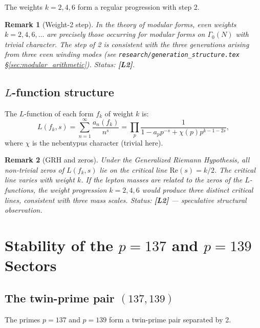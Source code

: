 \documentclass[11pt,a4paper]{article}
\newtheorem{remark}{Remark}
\begin{document}
The weights $k = 2, 4, 6$ form a regular progression with step 2.

\begin{remark}[Weight-2 step]
  In the theory of modular forms, even weights $k = 2, 4, 6, \ldots$ are
  precisely those occurring for modular forms on $\Gamma_0(N)$ with trivial
  character.  The step of 2 is consistent with the three generations arising
  from three even winding modes (see \texttt{research/generation\_structure.tex}
  §\ref{sec:modular_arithmetic}).  Status: \textbf{[L2]}.
\end{remark}

\subsection{$L$-function structure}

The $L$-function of each form $f_k$ of weight $k$ is:
\begin{equation}
  L(f_k, s) = \sum_{n=1}^\infty \frac{a_n(f_k)}{n^s}
  = \prod_p \frac{1}{1 - a_p p^{-s} + \chi(p) p^{k-1-2s}},
\end{equation}
where $\chi$ is the nebentypus character (trivial here).

\begin{remark}[GRH and zeros]
  Under the Generalized Riemann Hypothesis, all non-trivial zeros of $L(f_k, s)$
  lie on the critical line $\mathrm{Re}(s) = k/2$.  The critical line varies
  with weight $k$.  If the lepton masses are related to the zeros of the
  $L$-functions, the weight progression $k = 2, 4, 6$ would produce three
  distinct critical lines, consistent with three mass scales.
  Status: \textbf{[L2]} — speculative structural observation.
\end{remark}

\section{Stability of the $p = 137$ and $p = 139$ Sectors}
\label{sec:stability}

\subsection{The twin-prime pair $(137, 139)$}

The primes $p = 137$ and $p = 139$ form a twin-prime pair separated by 2.
\end{document}
